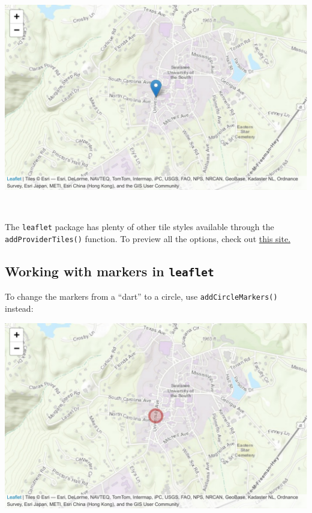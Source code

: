 \documentclass[]{book}
\newenvironment{Shaded}{\begin{snugshade}}{\end{snugshade}}
\newcommand{\DataTypeTok}[1]{\textcolor[rgb]{0.13,0.29,0.53}{#1}}
\newcommand{\DecValTok}[1]{\textcolor[rgb]{0.00,0.00,0.81}{#1}}
\newcommand{\KeywordTok}[1]{\textcolor[rgb]{0.13,0.29,0.53}{\textbf{#1}}}
\newcommand{\NormalTok}[1]{#1}
\newcommand{\OperatorTok}[1]{\textcolor[rgb]{0.81,0.36,0.00}{\textbf{#1}}}
\newcommand{\StringTok}[1]{\textcolor[rgb]{0.31,0.60,0.02}{#1}}
\begin{document}
\includegraphics{figures/unnamed-chunk-390-1.pdf}

~

The \texttt{leaflet} package has plenty of other tile styles available through the \texttt{addProviderTiles()} function. To preview all the options, check out \href{https://leaflet-extras.github.io/leaflet-providers/preview/}{this site.}

\hypertarget{working-with-markers-in-leaflet}{%
\subsection*{\texorpdfstring{Working with markers in \texttt{leaflet}}{Working with markers in leaflet}}\label{working-with-markers-in-leaflet}}

To change the markers from a ``dart'' to a circle, use \texttt{addCircleMarkers()} instead:

\begin{Shaded}
\end{Shaded}

\includegraphics{figures/unnamed-chunk-391-1.pdf}
\end{document}
